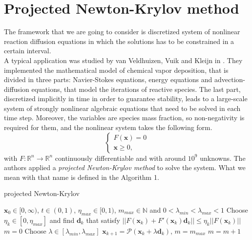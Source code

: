 \section{Projected Newton-Krylov method}
The framework that we are going to consider is discretized system of nonlinear reaction diffusion equations in which the solutions has to be constrained in a certain interval.\\
A typical application was studied by van Veldhuizen, Vuik and Kleijn in \cite{before_MAIN}. They implemented the mathematical model of chemical vapor deposition, that is divided in three parts: Navier-Stokes equations, energy equations and advection-diffusion equations, that model the iterations of reactive species. The last part, discretized implicitly in time in order to guarantee stability, leads to a large-scale system of strongly nonlinear algebraic equations that need to be solved in each time step. Moreover, the variables are species mass fraction, so non-negativity is required for them, and the nonlinear system takes the following form.
\begin{equation*}
\begin{cases}
F(\textbf{x}) = 0\\ \textbf{x} \geq 0, 
\end{cases}
\end{equation*}
with $ F: \mathbb{R}^n \rightarrow \mathbb{R}^n  $ continuously differentiable and with around $10^9$ unknowns.
  The authors applied a \textit{projected Newton-Krylov method} to solve the system. What we mean with that name is defined in the Algorithm 1. \\
\begin{algorithm}
	\caption{projected Newton-Krylov}
	\label{pNK}
	\begin{algorithmic}[1]
		\STATE 	$ \textbf{x}_0 \in [0, \infty) $, $ t \in (0,1) $, $ \eta_{max} \in [0,1) $, $ m_{max} \in \mathbb{N}  $ and $ 0 <  \lambda_{min} < \lambda_{max} < 1$
		\STATE Choose $\eta_k \in [0,\eta_{max}]$ and find $\textbf{d}_k$ that satisfy
		\STATE $ ||F(\textbf{x}_k) + F'(\textbf{x}_k)\textbf{d}_k||\leq \eta_k||F(\textbf{x}_k)|| $
		\STATE $ m = 0 $
		\STATE Choose $ \lambda \in  [\lambda_{min}, \lambda_{max}] $
		\STATE	$ \textbf{x}_{k+1} = \mathcal{P}(\textbf{x}_k + \lambda \textbf{d}_k)$,  $m = m_{max} $
		\ELSE
		\STATE $ m = m + 1$
		\ENDIF
		\ENDWHILE
		\ENDFOR
	\end{algorithmic}
\end{algorithm}
